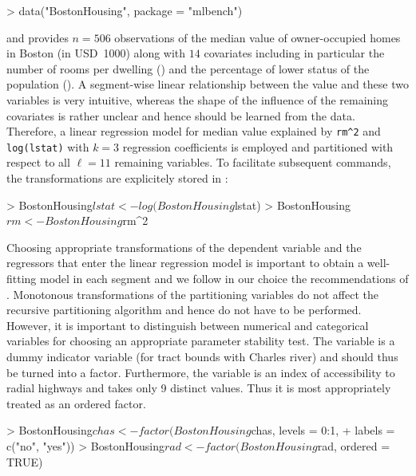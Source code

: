 \documentclass{Z}
\begin{document}
\begin{Schunk}
\begin{Sinput}
> data("BostonHousing", package = "mlbench")
\end{Sinput}
\end{Schunk}

and provides $n = 506$ observations of the median value of owner-occupied
homes in Boston (in USD~1000) along with $14$ covariates including in particular
the number of rooms per dwelling () and the percentage
of lower status of the population (). A segment-wise linear relationship between
the value and these two variables is very intuitive, whereas the shape of the influence
of the remaining covariates is rather unclear and hence should be learned from the data.
Therefore, a linear regression model for median value explained by \verb:rm^2:
and \verb:log(lstat): with $k = 3$ regression coefficients is employed and
partitioned with respect to all $\ell = 11$ remaining variables. To facilitate subsequent
commands, the transformations are explicitely stored in :

\begin{Schunk}
\begin{Sinput}
> BostonHousing$lstat <- log(BostonHousing$lstat)
> BostonHousing$rm <- BostonHousing$rm^2
\end{Sinput}
\end{Schunk}

Choosing appropriate
transformations of the dependent variable and the regressors that enter the linear
regression model is important to obtain a well-fitting model in each segment and
we follow in our choice the recommendations of \cite{BreimanFriedman1985}. Monotonous
transformations of the partitioning variables do not affect the recursive partitioning
algorithm and hence do not have to be performed. However, it is important to distinguish
between numerical and categorical variables for choosing an appropriate parameter 
stability test. The variable  is a dummy indicator variable (for tract bounds
with Charles river) and should thus be turned into a factor. Furthermore, the variable
 is an index of accessibility to radial highways and takes only 9 distinct
values. Thus it is most appropriately treated as an ordered factor.

\begin{Schunk}
\begin{Sinput}
> BostonHousing$chas <- factor(BostonHousing$chas, levels = 0:1, 
+     labels = c("no", "yes"))
> BostonHousing$rad <- factor(BostonHousing$rad, ordered = TRUE)
\end{Sinput}
\end{Schunk}
\end{document}
